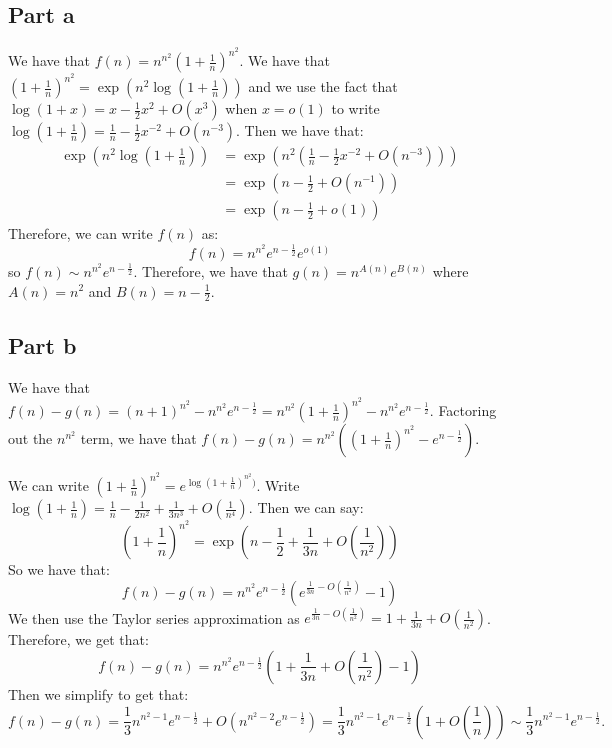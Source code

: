 \documentclass[]{article}
\begin{document}
\subsection{Part a}
We have that $f(n) = n^{n^2}(1 + \frac{1}{n})^{n^2}$. We have that $(1 + \frac{1}{n})^{n^2} = \exp\left(n^2 \log(1 + \frac{1}{n})\right)$ and we use the fact that $\log(1 + x) = x - \frac{1}{2}x^2 + O(x^3)$ when $x = o(1)$ to write $\log(1 + \frac{1}{n}) = \frac{1}{n} - \frac{1}{2}x^{-2} + O(n^{-3})$. Then we have that:
\begin{align*}
	\exp\left(n^2 \log(1 + \frac{1}{n})\right) &= \exp\left(n^2 \left(\frac{1}{n} - \frac{1}{2}x^{-2} + O(n^{-3}) \right)\right)\\
	&=  \exp\left( n  - \frac{1}{2}+ O(n^{-1})\right)\\
	&= \exp\left( n  - \frac{1}{2}+ o(1)\right)
\end{align*}
Therefore, we can write $f(n)$ as:
\begin{equation}
	f(n) = n^{n^2}e^{n - \frac{1}{2}}e^{o(1)}
\end{equation}
so $f(n) \sim n^{n^2}e^{n - \frac{1}{2}}$. 
Therefore, we have that $g(n) = n^{A(n)}e^{B(n)}$ where $A(n) = n^2$ and $B(n) = n - \frac{1}{2}$. 

\subsection{Part b}
We have that $f(n) - g(n) = (n + 1)^{n^2} - n^{n^2}e^{n - \frac{1}{2}} = n^{n^2}(1 + \frac{1}{n})^{n^2} - n^{n^2}e^{n - \frac{1}{2}}$. Factoring out the $n^{n^2}$ term, we have that $f(n) - g(n) = n^{n^2}\left((1 + \frac{1}{n})^{n^2} - e^{n - \frac{1}{2}} \right)$.

We can write $(1 + \frac{1}{n})^{n^2} = e^{\log(1 + \frac{1}{n})^{n^2})}$. Write $\log(1 + \frac{1}{n}) = \frac{1}{n} - \frac{1}{2 n^2} + \frac{1}{3 n^3} + O(\frac{1}{n^4})$. Then we can say:
\begin{equation}
	(1 + \frac{1}{n})^{n^2} = \exp(n - \frac{1}{2} + \frac{1}{3n} + O(\frac{1}{n^2}))
\end{equation}
So we have that:
\begin{equation}
	f(n) - g(n) = n^{n^2}e^{n - \frac{1}{2}}(e^{\frac{1}{3n} - O(\frac{1}{n^2})} - 1)
\end{equation}
We then use the Taylor series approximation as $e^{\frac{1}{3n} - O(\frac{1}{n^2})} = 1 + \frac{1}{3n} + O(\frac{1}{n^2})$.
Therefore, we get that:
\begin{equation}
	f(n) - g(n) = n^{n^2}e^{n - \frac{1}{2}}(1 + \frac{1}{3n} + O(\frac{1}{n^2}) - 1)
\end{equation}
Then we simplify to get that:
\begin{equation}
	f(n) - g(n) = \frac{1}{3} n^{n^2 - 1}e^{n - \frac{1}{2}} + O(n^{n^2 - 2}e^{n - \frac{1}{2}}) = \frac{1}{3} n^{n^2 - 1}e^{n - \frac{1}{2}}( 1 + O(\frac{1}{n})) \sim \frac{1}{3} n^{n^2 - 1}e^{n - \frac{1}{2}}. 
\end{equation}
\end{document}
